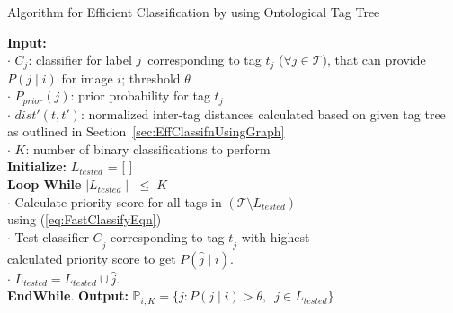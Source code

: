\begin{algorithm}[!t]
\fontsize{8pt}{1em}\selectfont
\caption{Algorithm for Efficient Classification by using Ontological Tag Tree} 
\label{EffClassfnAlgo} 
\textbf{Input:} \\ 
$\cdot$ $C_j$: classifier for label $j \,$ corresponding to tag $t_j$ ($\forall j \in \mathcal{T} $), that can provide $P(j \mid i)$ for image $i$; threshold $\theta$ \\ 
$\cdot$ $P_{prior}(j)$: prior probability for tag $t_j$  \\
$\cdot$ $dist'(t,t')$: normalized inter-tag distances calculated based on given tag tree as outlined in Section~\ref{sec:EffClassifnUsingGraph}\\
$\cdot$ $K$: number of binary classifications to perform \\ 
\textbf{Initialize:} $L_{tested} $ = [ ]  \\
\textbf{Loop While} $\mid  L_{tested}  \mid$  $ \le \; K$  \\
\hspace*{5mm} $\cdot$ Calculate priority score for all tags in $(\mathcal{T} \setminus L_{tested}  )$ \\
\hspace*{5mm} using (\ref{eq:FastClassifyEqn}) \\
\hspace*{5mm} $\cdot$ Test classifier $C_{\hat{j}}$ corresponding to tag $t_{\hat{j}}$  with highest \\
\hspace*{5mm} calculated priority score to get $P( \hat{j} \mid i)$. \\
\hspace*{5mm} $\cdot$  $L_{tested} = L_{tested} \cup \hat{j}$. \\
\textbf{EndWhile}. \textbf{Output:} $\mathbb{P}_{i,K} = \{ j: P(j \mid i) > \theta , \, \, \,  j \in  L_{tested} \} $ 
\end{algorithm}

